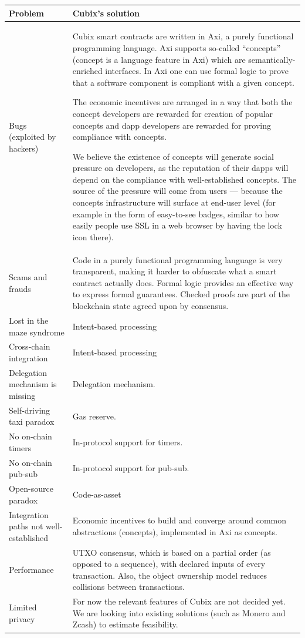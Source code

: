 \documentclass[a4paper]{article}
\begin{document}
\bigskip
\begin{tabularx}{\textwidth}{|l|X|}
\hline
\textbf{Problem} & \textbf{Cubix's solution} \\
\hline
Bugs (exploited by hackers) & Cubix smart contracts are written in Axi, a purely functional programming language. Axi supports so-called ``concepts'' (concept is a language feature in Axi) which are semantically-enriched interfaces. In Axi one can use formal logic to prove that a software component is compliant with a given concept.

The economic incentives are arranged in a way that both the concept developers are rewarded for creation of popular concepts and dapp developers are rewarded for proving compliance with concepts.

We believe the existence of concepts will generate social pressure on developers, as the reputation of their dapps will depend on the compliance with well-established concepts. The source of the pressure will come from users --- because the concepts infrastructure will surface at end-user level (for example in the form of easy-to-see badges, similar to how easily people use SSL in a web browser by having the lock icon there). \\
\hline
Scams and frauds & Code in a purely functional programming language is very transparent, making it harder to obfuscate what a smart contract actually does. Formal logic provides an effective way to express formal guarantees. Checked proofs are part of the blockchain state agreed upon by consensus. \\
\hline
Lost in the maze syndrome & Intent-based processing \\
\hline
Cross-chain integration & Intent-based processing \\
\hline
Delegation mechanism is missing & Delegation mechanism. \\
\hline
Self-driving taxi paradox & Gas reserve. \\
\hline
No on-chain timers & In-protocol support for timers. \\
\hline
No on-chain pub-sub & In-protocol support for pub-sub. \\
\hline
Open-source paradox & Code-as-asset \\
\hline
Integration paths not well-established & Economic incentives to build and converge around common abstractions (concepts), implemented in Axi as concepts. \\
\hline
Performance & UTXO consensus, which is based on a partial order (as opposed to a sequence), with declared inputs of every transaction. Also, the object ownership model reduces collisions between transactions. \\
\hline
Limited privacy & For now the relevant features of Cubix are not decided yet. We are looking into existing solutions (such as Monero and Zcash) to estimate feasibility. \\
\hline
\end{tabularx}
\bigskip
\end{document}
